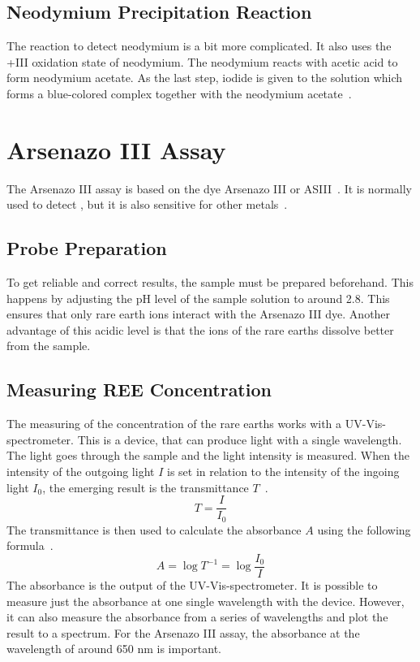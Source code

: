 \subsection{Neodymium Precipitation Reaction}
The reaction to detect neodymium is a bit more complicated.
It also uses the +III oxidation state of neodymium.
The neodymium reacts with acetic acid to form neodymium acetate.
As the last step, iodide is given to the solution which forms a blue-colored complex together with the neodymium acetate~\cite{janderblasius}.


\section{Arsenazo III Assay}
The Arsenazo III assay is based on the dye Arsenazo III or ASIII~\cite{arsenazo3assay}.
It is normally used to detect , but it is also sensitive for other metals~\cite{arsenazo3usage}.

\subsection{Probe Preparation}
To get reliable and correct results, the sample must be prepared beforehand.
This happens by adjusting the pH level of the sample solution to around 2.8.
This ensures that only rare earth ions interact with the Arsenazo III dye.
Another advantage of this acidic level is that the ions of the rare earths dissolve better from the sample.

\subsection{Measuring REE Concentration}
The measuring of the concentration of the rare earths works with a UV-Vis-spectrometer.
This is a device, that can produce light with a single wavelength.
The light goes through the sample and the light intensity is measured.
When the intensity of the outgoing light \(I\) is set in relation to the intensity of the ingoing light \(I_0\), the emerging result is the transmittance \(T\)~\cite{transmittanceformula}.
\[T=\frac{I}{I_0}\]
The transmittance is then used to calculate the absorbance \(A\) using the following formula~\cite{arbsorbanceformula}.
\[A=\log{T^{-1}}=\log{\frac{I_0}{I}}\]
The absorbance is the output of the UV-Vis-spectrometer.
It is possible to measure just the absorbance at one single wavelength with the device.
However, it can also measure the absorbance from a series of wavelengths and plot the result to a spectrum.
For the Arsenazo III assay, the absorbance at the wavelength of around 650 nm is important.

